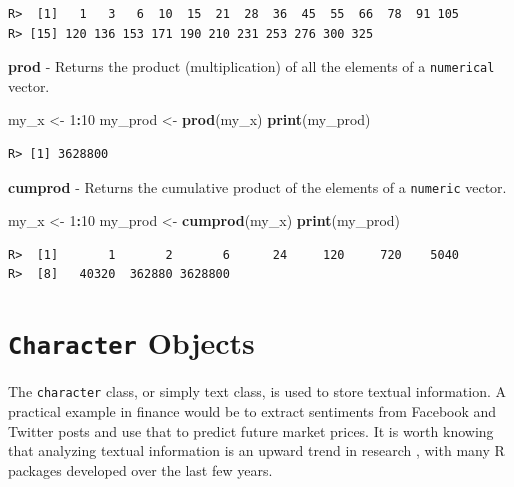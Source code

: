 \documentclass[
  12pt,
]{book}
\newenvironment{Shaded}{\begin{snugshade}}{\end{snugshade}}
\newcommand{\DecValTok}[1]{\textcolor[rgb]{0.06,0.06,0.06}{#1}}
\newcommand{\KeywordTok}[1]{\textcolor[rgb]{0.27,0.27,0.27}{\textbf{#1}}}
\newcommand{\NormalTok}[1]{#1}
\newcommand{\OperatorTok}[1]{\textcolor[rgb]{0.43,0.43,0.43}{\textbf{#1}}}
\newcommand{\StringTok}[1]{\textcolor[rgb]{0.5,0.5,0.5}{#1}}
\begin{document}
\begin{verbatim}
R>  [1]   1   3   6  10  15  21  28  36  45  55  66  78  91 105
R> [15] 120 136 153 171 190 210 231 253 276 300 325
\end{verbatim}

\textbf{prod} - Returns the product (multiplication) of all the elements of a \texttt{numerical} vector. 

\begin{Shaded}
\begin{Highlighting}[]
\NormalTok{my_x <-}\StringTok{ }\DecValTok{1}\OperatorTok{:}\DecValTok{10}
\NormalTok{my_prod <-}\StringTok{ }\KeywordTok{prod}\NormalTok{(my_x)}
\KeywordTok{print}\NormalTok{(my_prod)}
\end{Highlighting}
\end{Shaded}

\begin{verbatim}
R> [1] 3628800
\end{verbatim}

\textbf{cumprod} - Returns the cumulative product of the elements of a \texttt{numeric} vector. 

\begin{Shaded}
\begin{Highlighting}[]
\NormalTok{my_x <-}\StringTok{ }\DecValTok{1}\OperatorTok{:}\DecValTok{10}
\NormalTok{my_prod <-}\StringTok{ }\KeywordTok{cumprod}\NormalTok{(my_x)}
\KeywordTok{print}\NormalTok{(my_prod)}
\end{Highlighting}
\end{Shaded}

\begin{verbatim}
R>  [1]       1       2       6      24     120     720    5040
R>  [8]   40320  362880 3628800
\end{verbatim}

\hypertarget{character-objects}{%
\section{\texorpdfstring{\texttt{Character} Objects}{Character Objects}}\label{character-objects}}

The \texttt{character} class, or simply text class, is used to store textual information. A practical example in finance would be to extract sentiments from Facebook and Twitter posts and use that to predict future market prices. It is worth knowing that analyzing textual information is an upward trend in research \citep{gentzkow2017text}, with many R packages developed over the last few years.
\end{document}
